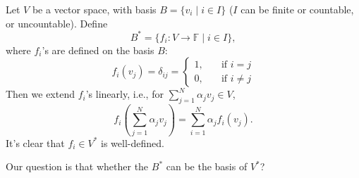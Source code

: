 \begin{definition}
Let $V$ be a vector space, with basis $B=\{v_i\mid i\in I\}$ 
($I$ can be finite or countable, or uncountable). 
Define
\[
B^*=\{f_i:V\to\mathbb{F}\mid i\in I\},
\]
where $f_i$'s are defined on the basis $B$:
\[
f_i(v_j)=\delta_{ij}=\left\{
\begin{aligned}
1,&\quad \text{if }i=j\\
0,&\quad \text{if }i\ne j
\end{aligned}
\right.
\]
Then we extend $f_i$'s linearly, i.e., for $\sum_{j=1}^N\alpha_jv_j\in V$,
\[
f_i(\sum_{j=1}^N\alpha_jv_j)=\sum_{i=1}^N\alpha_jf_i(v_j).
\]
It's clear that $f_i\in V^*$ is well-defined. 
\end{definition}
Our question is that whether the $B^*$ can be the basis of $V^*$?






















